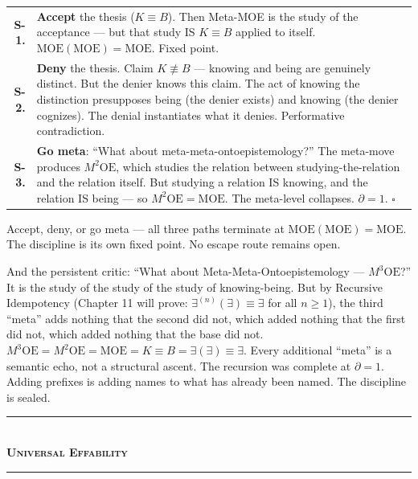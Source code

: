 \documentclass[10pt, openany, oneside]{book}
\renewcommand{\normalsize}{\fontsize{10}{13}\selectfont}
\renewcommand{\footnotesize}{\fontsize{8.5}{11}\selectfont}
\begin{document}
{\footnotesize
\noindent\begin{tabular}{r p{}}
\textbf{S-1.} & \textbf{Accept} the thesis ($K \equiv B$). Then Meta-MOE is the study of the acceptance --- but that study IS $K \equiv B$ applied to itself. $\text{MOE}(\text{MOE}) = \text{MOE}$. Fixed point. \\[0.3em]
\textbf{S-2.} & \textbf{Deny} the thesis. Claim $K \not\equiv B$ --- knowing and being are genuinely distinct. But the denier knows this claim. The act of knowing the distinction presupposes being (the denier exists) and knowing (the denier cognizes). The denial instantiates what it denies. Performative contradiction. \\[0.3em]
\textbf{S-3.} & \textbf{Go meta}: ``What about meta-meta-ontoepistemology?'' The meta-move produces $M^2\text{OE}$, which studies the relation between studying-the-relation and the relation itself. But studying a relation IS knowing, and the relation IS being --- so $M^2\text{OE} = \text{MOE}$. The meta-level collapses. $\partial = 1$. $\square$ \\[0.3em]
\end{tabular}
}

\vspace{0.8em}

\noindent Accept, deny, or go meta --- all three paths terminate at $\text{MOE}(\text{MOE}) = \text{MOE}$. The discipline is its own fixed point. No escape route remains open.

And the persistent critic: ``What about Meta-Meta-Ontoepistemology --- $M^3\text{OE}$?'' It is the study of the study of the study of knowing-being. But by Recursive Idempotency (Chapter 11 will prove: $\exists^{(n)}(\exists) \equiv \exists$ for all $n \geq 1$), the third ``meta'' adds nothing that the second did not, which added nothing that the first did not, which added nothing that the base did not. $M^3\text{OE} = M^2\text{OE} = \text{MOE} = K \equiv B = \exists(\exists) \equiv \exists$. Every additional ``meta'' is a semantic echo, not a structural ascent. The recursion was complete at $\partial = 1$. Adding prefixes is adding names to what has already been named. The discipline is sealed.

\vspace{1.5em}


\begin{center}
    \rule{0.3\textwidth}{0.4pt}\\[0.5em]
    {\normalsize\bfseries\scshape Universal Effability}\\[0.3em]
    \rule{0.3\textwidth}{0.4pt}
\end{center}
\end{document}
